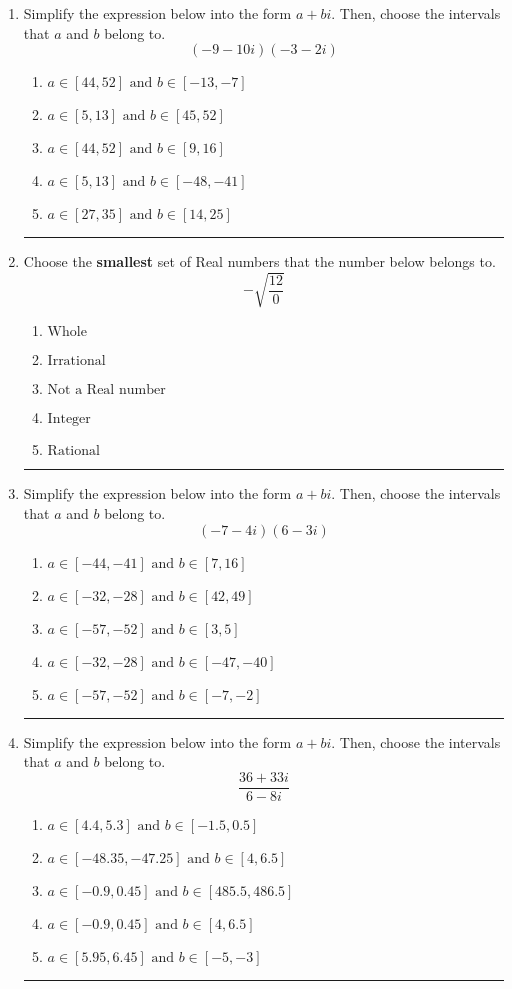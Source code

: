\documentclass[14pt]{extbook}
\newcommand{\litem}[1]{\item#1\hspace*{-1cm}\rule{\textwidth}{0.4pt}}
\begin{document}
\begin{enumerate}
\litem{
Simplify the expression below into the form $a+bi$. Then, choose the intervals that $a$ and $b$ belong to.\[ (-9 - 10 i)(-3 - 2 i) \]\begin{enumerate}[label=\Alph*.]
\item \( a \in [44, 52] \text{ and } b \in [-13, -7] \)
\item \( a \in [5, 13] \text{ and } b \in [45, 52] \)
\item \( a \in [44, 52] \text{ and } b \in [9, 16] \)
\item \( a \in [5, 13] \text{ and } b \in [-48, -41] \)
\item \( a \in [27, 35] \text{ and } b \in [14, 25] \)

\end{enumerate} }
\litem{
Choose the \textbf{smallest} set of Real numbers that the number below belongs to.\[ -\sqrt{\frac{12}{0}} \]\begin{enumerate}[label=\Alph*.]
\item \( \text{Whole} \)
\item \( \text{Irrational} \)
\item \( \text{Not a Real number} \)
\item \( \text{Integer} \)
\item \( \text{Rational} \)

\end{enumerate} }
\litem{
Simplify the expression below into the form $a+bi$. Then, choose the intervals that $a$ and $b$ belong to.\[ (-7 - 4 i)(6 - 3 i) \]\begin{enumerate}[label=\Alph*.]
\item \( a \in [-44, -41] \text{ and } b \in [7, 16] \)
\item \( a \in [-32, -28] \text{ and } b \in [42, 49] \)
\item \( a \in [-57, -52] \text{ and } b \in [3, 5] \)
\item \( a \in [-32, -28] \text{ and } b \in [-47, -40] \)
\item \( a \in [-57, -52] \text{ and } b \in [-7, -2] \)

\end{enumerate} }
\litem{
Simplify the expression below into the form $a+bi$. Then, choose the intervals that $a$ and $b$ belong to.\[ \frac{36 + 33 i}{6 - 8 i} \]\begin{enumerate}[label=\Alph*.]
\item \( a \in [4.4, 5.3] \text{ and } b \in [-1.5, 0.5] \)
\item \( a \in [-48.35, -47.25] \text{ and } b \in [4, 6.5] \)
\item \( a \in [-0.9, 0.45] \text{ and } b \in [485.5, 486.5] \)
\item \( a \in [-0.9, 0.45] \text{ and } b \in [4, 6.5] \)
\item \( a \in [5.95, 6.45] \text{ and } b \in [-5, -3] \)


\end{enumerate}}
\end{enumerate}
\end{document}
